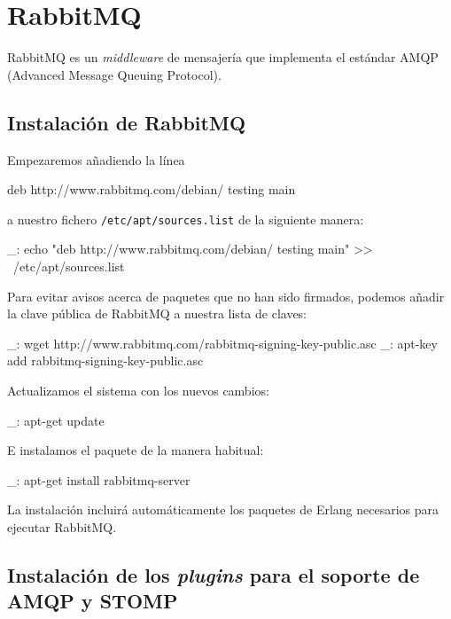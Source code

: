 \section{RabbitMQ}
\label{anx:inst-rabbitmq}


RabbitMQ es un \emph{middleware} de mensajería que implementa el estándar AMQP (Advanced Message Queuing Protocol).


\subsection{Instalación de RabbitMQ}

Empezaremos añadiendo la línea

\begin{bashcode}
deb http://www.rabbitmq.com/debian/ testing main
\end{bashcode}

a nuestro fichero \texttt{/etc/apt/sources.list} de la siguiente manera:

\begin{bashcode}
_: echo "deb http://www.rabbitmq.com/debian/ testing main" >> \
/etc/apt/sources.list
\end{bashcode}

Para evitar avisos acerca de paquetes que no han sido firmados, podemos añadir la clave pública de RabbitMQ a nuestra lista de claves:

\begin{bashcode}
_: wget http://www.rabbitmq.com/rabbitmq-signing-key-public.asc
_: apt-key add rabbitmq-signing-key-public.asc
\end{bashcode}

Actualizamos el sistema con los nuevos cambios:

\begin{bashcode}
_: apt-get update
\end{bashcode}

E instalamos el paquete de la manera habitual:

\begin{bashcode}
_: apt-get install rabbitmq-server
\end{bashcode}

La instalación incluirá automáticamente los paquetes de Erlang necesarios para ejecutar RabbitMQ.


\subsection{Instalación de los \emph{plugins} para el soporte de AMQP y STOMP}

